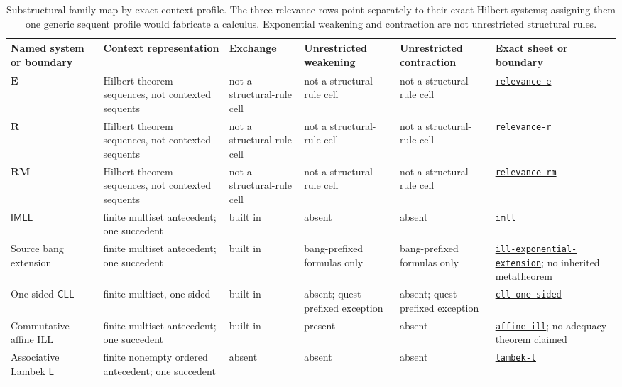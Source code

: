 \begin{table}[!htbp]
\centering
\begingroup\scriptsize
\setlength{\tabcolsep}{3pt}
\begin{tabular}{@{}p{}p{}p{}
  p{}p{}p{}@{}}
\toprule
Named system or boundary & Context representation & Exchange & Unrestricted
weakening & Unrestricted contraction & Exact sheet or boundary \\
\midrule
\(\mathbf E\) & Hilbert theorem sequences, not contexted sequents & not a
structural-rule cell & not a structural-rule cell & not a structural-rule cell
& \hyperref[sheet:relevance-e]{\texttt{relevance-e}} \\
\(\mathbf R\) & Hilbert theorem sequences, not contexted sequents & not a
structural-rule cell & not a structural-rule cell & not a structural-rule cell
& \hyperref[sheet:relevance-r]{\texttt{relevance-r}} \\
\(\mathbf{RM}\) & Hilbert theorem sequences, not contexted sequents & not a
structural-rule cell & not a structural-rule cell & not a structural-rule cell
& \hyperref[sheet:relevance-rm]{\texttt{relevance-rm}} \\
\(\mathsf{IMLL}\) & finite multiset antecedent; one succedent & built in &
absent & absent & \hyperref[sheet:imll]{\texttt{imll}} \\
Source bang extension & finite multiset antecedent; one succedent & built in &
bang-prefixed formulas only & bang-prefixed formulas only &
\hyperref[sheet:ill-exponential-extension]{\texttt{ill-exponential-extension}};
no inherited metatheorem \\
One-sided \(\mathsf{CLL}\) & finite multiset, one-sided & built in &
absent; quest-prefixed exception & absent; quest-prefixed exception &
\hyperref[sheet:cll-one-sided]{\texttt{cll-one-sided}} \\
Commutative affine ILL & finite multiset antecedent; one succedent & built in &
present & absent & \hyperref[sheet:affine-ill]{\texttt{affine-ill}};
no adequacy theorem claimed \\
Associative Lambek \(\mathsf L\) & finite nonempty ordered antecedent; one
succedent & absent & absent & absent &
\hyperref[sheet:lambek-l]{\texttt{lambek-l}} \\
\bottomrule
\end{tabular}
\endgroup
\caption{Substructural family map by exact context profile.
The three relevance rows point separately to their exact Hilbert systems;
assigning them one generic sequent profile would fabricate a calculus.
Exponential weakening and contraction are not unrestricted structural rules.}
\label{tab:p08-substructural-family}
\end{table}


